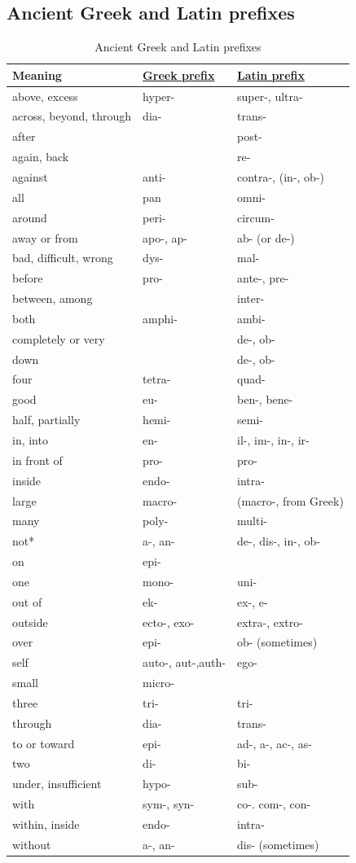 \documentclass[11pt]{article}
\begin{document}
\subsection{Ancient Greek and Latin prefixes}
\label{sec:org6bd3e09}
\begin{table}[htbp]
\caption{\label{tab:ancient-greek-latin-prefixes}Ancient Greek and Latin prefixes}
\centering
\begin{tabular}{lll}
Meaning & \hyperref[org8d0d652]{Greek prefix} & \hyperref[org6406b17]{Latin prefix}\\
\hline
above, excess & hyper- & super-, ultra-\\
across, beyond, through & dia- & trans-\\
after &  & post-\\
again, back &  & re-\\
against & anti- & contra-, (in-, ob-)\\
all & pan & omni-\\
around & peri- & circum-\\
away or from & apo-, ap- & ab- (or de-)\\
bad, difficult, wrong & dys- & mal-\\
before & pro- & ante-, pre-\\
between, among &  & inter-\\
both & amphi- & ambi-\\
completely or very &  & de-, ob-\\
down &  & de-, ob-\\
four & tetra- & quad-\\
good & eu- & ben-, bene-\\
half, partially & hemi- & semi-\\
in, into & en- & il-, im-, in-, ir-\\
in front of & pro- & pro-\\
inside & endo- & intra-\\
large & macro- & (macro-, from Greek)\\
many & poly- & multi-\\
not* & a-, an- & de-, dis-, in-, ob-\\
on & epi- & \\
one & mono- & uni-\\
out of & ek- & ex-, e-\\
outside & ecto-, exo- & extra-, extro-\\
over & epi- & ob- (sometimes)\\
self & auto-, aut-,auth- & ego-\\
small & micro- & \\
three & tri- & tri-\\
through & dia- & trans-\\
to or toward & epi- & ad-, a-, ac-, as-\\
two & di- & bi-\\
under, insufficient & hypo- & sub-\\
with & sym-, syn- & co-. com-, con-\\
within, inside & endo- & intra-\\
without & a-, an- & dis- (sometimes)\\
\end{tabular}
\end{table}
\end{document}

